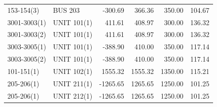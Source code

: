 \documentclass[10pt]{report}
\begin{document}
\begin{table}[H]
{\begin{tabular}{llrrrr}
153-154(3) & BUS 203 & -300.69 & 366.36 & 350.00 & 104.67 \\
3001-3003(1) & UNIT 101(1) & 411.61 & 408.97 & 300.00 & 136.32 \\
3001-3003(2) & UNIT 101(1) & 411.61 & 408.97 & 300.00 & 136.32 \\
3003-3005(1) & UNIT 101(1) & -388.90 & 410.00 & 350.00 & 117.14 \\
3003-3005(2) & UNIT 101(1) & -388.90 & 410.00 & 350.00 & 117.14 \\
101-151(1) & UNIT 102(1) & 1555.32 & 1555.32 & 1350.00 & 115.21 \\
205-206(1) & UNIT 211(1) & -1265.65 & 1265.65 & 1250.00 & 101.25 \\
205-206(1) & UNIT 212(1) & -1265.65 & 1265.65 & 1250.00 & 101.25 \\
\bottomrule
\end{tabular}}
\end{table}
\end{document}
